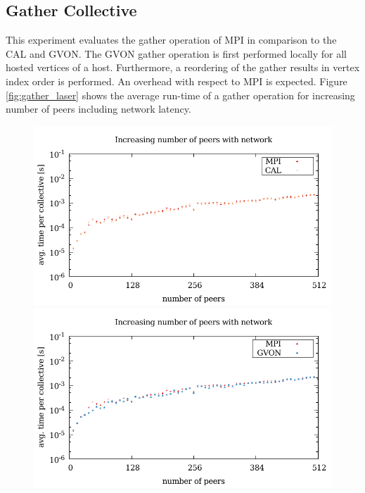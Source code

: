 \subsection*{Gather Collective}
This experiment evaluates the gather operation of MPI in comparison to
the CAL and GVON.  The GVON gather operation is first performed locally
for all hosted vertices of a host. Furthermore, a reordering of the
gather results in vertex index order is performed. An overhead with
respect to MPI is expected.  Figure \ref{fig:gather_laser} shows the
average run-time of a gather operation for increasing number of peers
including network latency.

\begin{figure}[H]
  \begin{minipage}[t]{0.5\textwidth}
    \includegraphics[width=\textwidth]{plots/50_collective_network_cal_laser}
    \includegraphics[width=\textwidth]{plots/50_collective_network_gvon_laser}

\end{minipage}
\end{figure}
